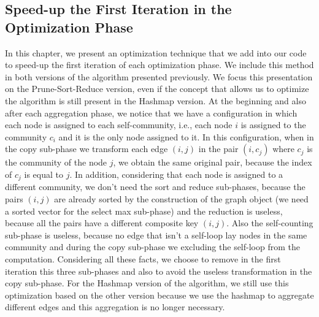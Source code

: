 \subsection{Speed-up the First Iteration in the Optimization Phase}\label{f-1}
In this chapter, we present an optimization technique that we add into our code to speed-up the first iteration of each optimization phase. We include this method in both versions of the algorithm presented previously. We focus this presentation on the Prune-Sort-Reduce version, even if the concept that allows us to optimize the algorithm is still present in the Hashmap version. At the beginning and also after each aggregation phase, we notice that we have a configuration in which each node is assigned to each self-community, i.e., each node $i$ is assigned to the community $c_i$ and it is the only node assigned to it. In this configuration, when in the copy sub-phase we transform each edge $(i,j)$ in the pair $(i,c_j)$ where $c_j$ is the community of the node $j$, we obtain the same original pair, because the index of $c_j$ is equal to $j$. In addition, considering that each node is assigned to a different community, we don't need the sort and reduce sub-phases, because the pairs $(i, j)$ are already sorted by the construction of the graph object (we need a sorted vector for the select max sub-phase) and the reduction is useless, because all the pairs have a different composite key $(i, j)$.
Also the self-counting sub-phase is useless, because no edge that isn't a self-loop lay  nodes in the same community and during the copy sub-phase we excluding the self-loop from the computation. 
Considering all these facts, we choose to remove in the first iteration this three sub-phases and also to avoid the useless transformation in the copy sub-phase. For the Hashmap version of the algorithm, we still use this optimization based on the other version because we use the hashmap to aggregate different edges and this aggregation is no longer necessary.

